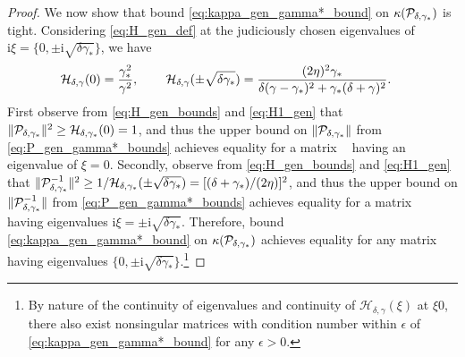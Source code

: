 \documentclass[review]{siamart}
\DeclareMathOperator{\cL}{\widehat{\mathcal{L}}}
\begin{document}
\begin{proof}
We now show that bound \eqref{eq:kappa_gen_gamma*_bound} on $\kappa({\cal P}_{\delta,\gamma_*})$
is tight. Considering \eqref{eq:H_gen_def} at the judiciously chosen eigenvalues of
$\mathrm{i} \xi = \{ 0, \pm \mathrm{i} \sqrt{\delta \gamma_*}\}$, we have
%
\begin{align}
\label{eq:H1_gen}
{\cal H}_{\delta,\gamma}(0) 
	&= \frac{\gamma_*^2}{\gamma^2}, 
\hspace{5ex}
{\cal H}_{\delta,\gamma}(\pm \sqrt{\delta \gamma_*}) = 
	\frac{(2 \eta)^2 \gamma_*}{\delta( \gamma- \gamma_*)^2 + \gamma_* (\delta + \gamma)^2 }.
\end{align}
%
First observe from \eqref{eq:H_gen_bounds} and \eqref{eq:H1_gen} that $\Vert {\cal
P}_{\delta,\gamma_*} \Vert^2 \geq {\cal H}_{\delta,\gamma_*}(0) = 1$, and thus the upper bound
on $\Vert {\cal P}_{\delta,\gamma_*} \Vert$ from \eqref{eq:P_gen_gamma*_bounds} achieves
equality for a matrix $\cL$ having an eigenvalue of $\xi = 0$.
Secondly, observe from \eqref{eq:H_gen_bounds} and \eqref{eq:H1_gen} that $\Vert {\cal
P}_{\delta,\gamma_*}^{-1} \Vert^2 \geq 1/{\cal H}_{\delta,\gamma_*}(\pm \sqrt{\delta  \gamma_*})= [(\delta + \gamma_*)/(2\eta)]^2$, and thus the upper bound on $\Vert {\cal
P}_{\delta,\gamma_*}^{-1} \Vert$ from \eqref{eq:P_gen_gamma*_bounds} achieves equality for
a matrix $\cL$ having eigenvalues $\mathrm{i} \xi = \pm \mathrm{i} \sqrt{\delta \gamma_*}$.
Therefore, bound \eqref{eq:kappa_gen_gamma*_bound} on $\kappa({\cal P}_{\delta,\gamma_*})$
achieves equality for any matrix $\cL$ having eigenvalues $\{0, \pm
\mathrm{i}\sqrt{\delta \gamma_*}\}$.\footnote{By nature of the continuity of
eigenvalues and continuity of $\mathcal{H}_{\delta,\gamma}(\xi)$ at $\xi 0$, there
also exist nonsingular matrices with condition number within
$\epsilon$ of \eqref{eq:kappa_gen_gamma*_bound} for any $\epsilon > 0$.}


\end{proof}
\end{document}
